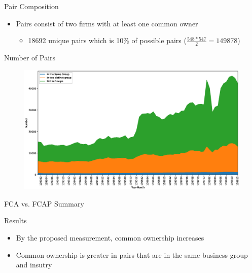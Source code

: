\documentclass{beamer}
\begin{document}
	\begin{frame}{Pair Composition}
		\begin{itemize}
		
			\item Pairs consist of two firms  with at least one common owner
			\begin{itemize}
				\item  18692 unique pairs which is 10\% of possible pairs 
				\tiny ($ \frac{548*547}{2}= 149878 $)
				\normalsize
			\end{itemize}
		\end{itemize}
		
		\begin{table}[htbp]
			\centering
			{
				\footnotesize
			
				
			}
		\end{table}
		
		
		\begin{table}
			\resizebox{0.7\textwidth}{!}
			{
				
			}
		\end{table}%
		
	\end{frame}  
	
	
	

	\begin{frame}{Number of Pairs}
		\begin{figure}[htbp]
			\includegraphics[width=0.9\linewidth]{Output/idMonth.eps}
		\end{figure}
	\end{frame}
	
	
	
	
	\begin{frame}{FCA vs. FCAP Summary}
		\begin{table}[htbp]
			\centering
			\resizebox{0.8\textwidth}{!}
			{
				  }          
		\end{table}%
		\begin{block}{Results}
			\small
			\begin{itemize}
				\item By the proposed measurement, common ownership increases
				\item Common ownership is greater in pairs that  are in the same business group and insutry
			\end{itemize}
		\end{block}
	\end{frame}
	
\end{document}

